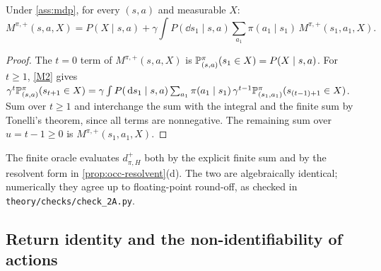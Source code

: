 \begin{proposition}\label{prop:occ-bellman-general}
Under \cref{ass:mdp}, for every $(s,a)$ and measurable $X$:
\[
M^{\pi,+}(s,a,X)=P(X\mid s,a)+\gamma\int P(\dd s_1\mid s,a)\sum_{a_1}\pi(a_1\mid s_1)\,M^{\pi,+}(s_1,a_1,X).
\]
\end{proposition}
\begin{proof}
The $t=0$ term of $M^{\pi,+}(s,a,X)$ is $\mathbb{P}^\pi_{(s,a)}(s_1\in X)=P(X\mid s,a)$.
For $t\ge1$, \ref{M2} gives
$\gamma^t\mathbb{P}^\pi_{(s,a)}(s_{t+1}\in X)=\gamma\int P(\,\mathrm{d} s_1\mid s,a)\sum_{a_1}\pi(a_1\mid s_1)\,\gamma^{t-1}\mathbb{P}^\pi_{(s_1,a_1)}(s_{(t-1)+1}\in X)$.
Sum over $t\ge1$ and interchange the sum with the integral and the finite sum by Tonelli's theorem, since all terms are nonnegative.
The remaining sum over $u=t-1\ge0$ is $M^{\pi,+}(s_1,a_1,X)$.
\end{proof}

\begin{remark}[validation]
The finite oracle evaluates $d^+_{\pi,H}$ both by the explicit finite sum and by the resolvent form in \cref{prop:occ-resolvent}(d).
The two are algebraically identical; numerically they agree up to floating-point round-off, as checked in \texttt{theory/checks/check\_2A.py}.
\end{remark}

\subsection{Return identity and the non-identifiability of actions}\label{sec:occ-return}

